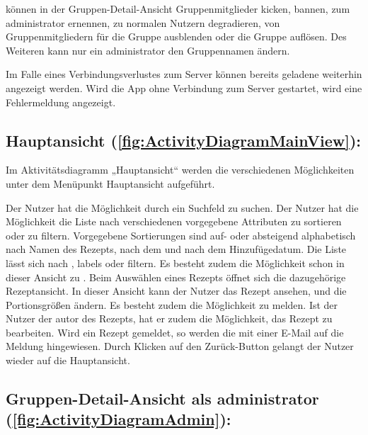 \documentclass[parskip=full]{scrartcl}
\begin{document}
 können in der Gruppen-Detail-Ansicht Gruppenmitglieder \gls{kicken}, \gls{bannen}, zum \gls{administrator} ernennen,  zu normalen Nutzern degradieren,  von Gruppenmitgliedern für die Gruppe \gls{ausblenden} oder die Gruppe auflösen. Des Weiteren kann nur ein \gls{administrator} den Gruppennamen ändern.

Im Falle eines Verbindungsverlustes zum Server können bereits geladene  weiterhin angezeigt werden. Wird die App ohne Verbindung zum Server gestartet, wird eine Fehlermeldung angezeigt.

\subsection{Hauptansicht (\autoref{fig:ActivityDiagramMainView}):}

Im Aktivitätsdiagramm „Hauptansicht“
werden die verschiedenen Möglichkeiten unter dem Menüpunkt Hauptansicht aufgeführt.

Der Nutzer hat die Möglichkeit  durch ein Suchfeld zu suchen.
Der Nutzer hat die Möglichkeit die Liste nach verschiedenen vorgegebene Attributen zu sortieren oder zu filtern.
Vorgegebene Sortierungen sind auf- oder absteigend alphabetisch nach Namen des Rezepts, nach dem  und nach dem Hinzufügedatum.
Die Liste lässt sich nach , \gls{labels} oder  filtern.
Es besteht zudem die Möglichkeit  schon in dieser Ansicht zu .\newline
Beim Auswählen eines Rezepts öffnet sich die dazugehörige Rezeptansicht.
In dieser Ansicht kann der Nutzer das Rezept ansehen,  und die Portionsgrößen ändern.
Es besteht zudem die Möglichkeit  zu melden.
Ist der Nutzer der \gls{autor} des Rezepts, hat er zudem die Möglichkeit, das Rezept zu bearbeiten.
Wird ein Rezept gemeldet, so werden die  mit einer E-Mail auf die Meldung hingewiesen.\newline
Durch Klicken auf den Zurück-Button gelangt der Nutzer wieder auf die Hauptansicht.\par


\subsection{Gruppen-Detail-Ansicht als \gls{administrator} (\autoref{fig:ActivityDiagramAdmin}):}
\end{document}
